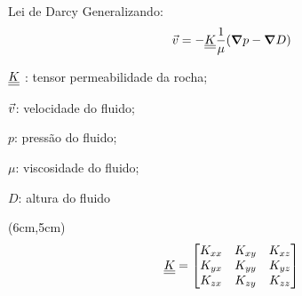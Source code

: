 \documentclass[professionalfont]{beamer}
\begin{document}
\begin{frame}{Lei de Darcy}
    Generalizando:
    \begin{equation}
        \vec{v} = -\underline{\underline{K}} \dfrac{1}{\mu} (\mbox{\boldmath$ \nabla $} p - \mbox{\boldmath$ \nabla $} D)
    \end{equation}
    
    \vspace{0.3cm}
    
    \begin{description}[]
        \item $\underline{\underline{K}}$ : tensor permeabilidade da rocha;
        \item $\vec{v}$: velocidade do fluido;
        \item $p$: pressão do fluido;
        \item $\mu$: viscosidade do fluido;
        \item $D$: altura do fluido
    \end{description}
    
    \begin{textblock*}{.5\paperwidth}(6cm,5cm)
        \begin{align*}
            \underline{\underline{K}} = 
            \begin{bmatrix}
            	K_{xx} & K_{xy} & K_{xz} \\
            	K_{yx} & K_{yy} & K_{yz} \\
            	K_{zx} & K_{zy} & K_{zz}
	        \end{bmatrix}
        \end{align*}
    \end{textblock*}
    
\end{frame}
\end{document}
